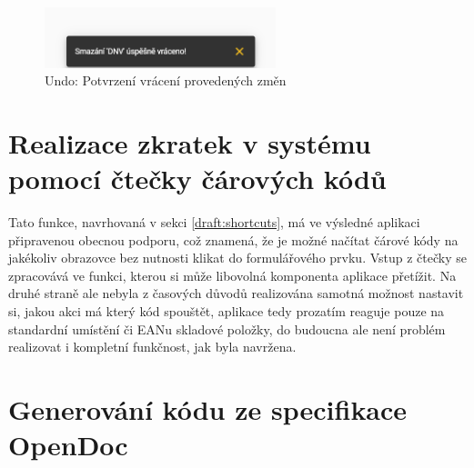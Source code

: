 \begin{figure}[h]
\includegraphics[width=0.6\textwidth]{../png/app/undo_snack_after.png}
\caption{Undo: Potvrzení vrácení provedených změn} \label{picture:undo-after}
\end{figure}


\section{Realizace zkratek v systému pomocí čtečky čárových kódů}\label{implementation:shortcuts}

Tato funkce, navrhovaná v sekci \ref{draft:shortcuts}, má ve výsledné aplikaci připravenou obecnou podporu, což znamená, že je možné načítat čárové kódy na jakékoliv obrazovce bez nutnosti klikat do formulářového prvku. Vstup z čtečky se zpracovává ve funkci, kterou si může libovolná komponenta aplikace přetížit. Na druhé straně ale nebyla z časových důvodů realizována samotná možnost nastavit si, jakou akci má který kód spouštět, aplikace tedy prozatím reaguje pouze na standardní  umístění či EANu skladové položky, do budoucna ale není problém realizovat i kompletní funkčnost, jak byla navržena.


\section{Generování kódu ze specifikace OpenDoc}\label{implementation:codegen}

